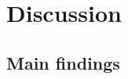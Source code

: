 \documentclass[10pt,letterpaper]{article}
\newcommand{\lorem}{{\bf LOREM}}
\newcommand{\ipsum}{{\bf IPSUM}}
\begin{document}
%
%
%
%
%

\section*{Discussion}\label{discussion}

\subsection*{Main findings}\label{main-findings}
\end{document}

